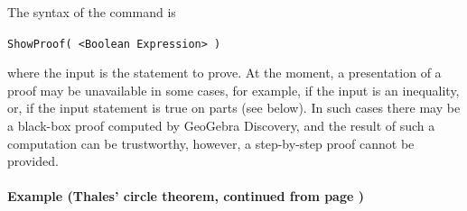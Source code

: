 \documentclass{article}
\begin{document}
The syntax of the command is
\begin{center}
    \texttt{ShowProof( <Boolean Expression> )}
\end{center}
where the input is the statement to prove. At the moment, a presentation of a proof may be unavailable in some cases, for example, if the input is an inequality, or, if the input statement is true on parts (see below). In such cases there may be a black-box proof computed by GeoGebra Discovery, and the result of such a computation can be trustworthy, however, a step-by-step proof cannot be provided.

\paragraph{Example (Thales' circle theorem, continued from page \pageref{ex:ThalesCircleTheorem})}
\end{document}
